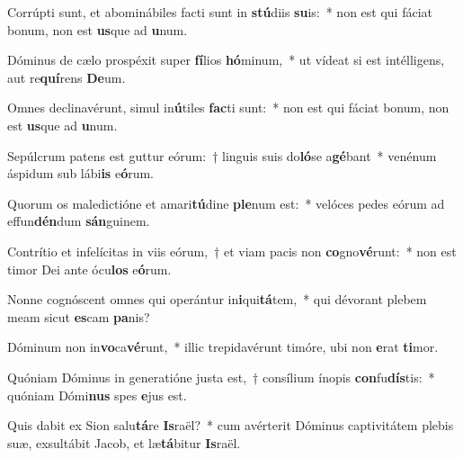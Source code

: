 \item Corrúpti sunt, et abominábiles facti sunt in \textbf{stú}diis \textbf{su}is:~* non est qui fáciat bonum, non est \textbf{us}que ad \textbf{u}num.
\item Dóminus de cælo prospéxit super \textbf{fí}lios \textbf{hó}minum,~* ut vídeat si est intélligens, aut re\textbf{quí}rens \textbf{De}um.
\item Omnes declinavérunt, simul in\textbf{ú}tiles \textbf{fac}ti sunt:~* non est qui fáciat bonum, non est \textbf{us}que ad \textbf{u}num.
\item Sepúlcrum patens est guttur eórum:~† linguis suis do\textbf{ló}se a\textbf{gé}bant~* venénum áspidum sub lábi\textbf{is} e\textbf{ó}rum.
\item Quorum os maledictióne et amari\textbf{tú}dine \textbf{ple}num est:~* velóces pedes eórum ad effun\textbf{dén}dum \textbf{sán}guinem.
\item Contrítio et infelícitas in viis eórum,~† et viam pacis non \textbf{co}gno\textbf{vé}runt:~* non est timor Dei ante ócu\textbf{los} e\textbf{ó}rum.
\item Nonne cognóscent omnes qui operántur in\textbf{i}qui\textbf{tá}tem,~* qui dévorant plebem meam sicut \textbf{es}cam \textbf{pa}nis?
\item Dóminum non in\textbf{vo}ca\textbf{vé}runt,~* illic trepidavérunt timóre, ubi non \textbf{e}rat \textbf{ti}mor.
\item Quóniam Dóminus in generatióne justa est,~† consílium ínopis \textbf{con}fu\textbf{dís}tis:~* quóniam Dómi\textbf{nus} spes \textbf{e}jus est.
\item Quis dabit ex Sion salu\textbf{tá}re \textbf{Is}raël?~* cum avérterit Dóminus captivitátem plebis suæ, exsultábit Jacob, et læ\textbf{tá}bitur \textbf{Is}raël.
